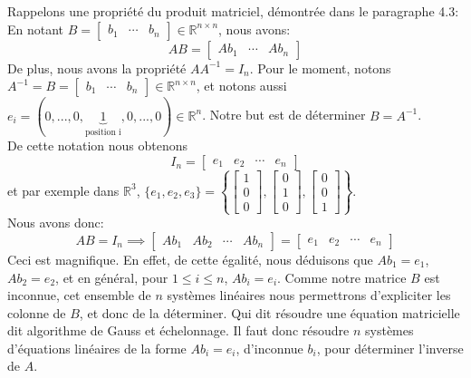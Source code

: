 \documentclass{article}
\newcommand{\R}{\mathbb{R}}
\newcommand{\cross}{\times}
\begin{document}
\noindent Rappelons une propriété du produit matriciel, démontrée dans le paragraphe 4.3: \\
En notant $B = \begin{bmatrix} b_1 & \cdots & b_n \end{bmatrix} \in \R^{n \cross n}$, nous avons:
$$AB = \begin{bmatrix} Ab_1 & \cdots & Ab_n \end{bmatrix}$$
De plus, nous avons la propriété $AA^{-1} = I_n$. Pour le moment, notons $A^{-1} = B = \begin{bmatrix} b_1 & \cdots & b_n \end{bmatrix} \in \R^{n \cross n}$, et notons aussi $e_i = (0, ..., 0, \underbrace{1}_{\text{position i}}, 0, ..., 0) \in \R^n$. Notre but est de déterminer $B = A^{-1}$. \\
De cette notation nous obtenons
$$I_n = \begin{bmatrix} e_1 & e_2 & \cdots & e_n \end{bmatrix}$$ 
et par exemple dans $\R^3$, $\{ e_1, e_2, e_3 \} = \left\{ \begin{bmatrix} 1 \\ 0 \\ 0 \end{bmatrix}, \begin{bmatrix} 0 \\ 1 \\ 0 \end{bmatrix}, \begin{bmatrix} 0 \\ 0 \\ 1 \end{bmatrix} \right\}$. \\

\noindent Nous avons donc:
$$AB = I_n \implies \begin{bmatrix} Ab_1 & Ab_2 & \cdots & Ab_n \end{bmatrix} = \begin{bmatrix} e_1 & e_2 & \cdots & e_n \end{bmatrix}$$
Ceci est magnifique. En effet, de cette égalité, nous déduisons que $Ab_1 = e_1$, $Ab_2 = e_2$, et en général, pour $1 \leq i \leq n$, $Ab_i = e_i$. Comme notre matrice $B$ est inconnue, cet ensemble de $n$ systèmes linéaires nous permettrons d'expliciter les colonne de $B$, et donc de la déterminer. Qui dit résoudre une équation matricielle dit algorithme de Gauss et échelonnage. Il faut donc résoudre $n$ systèmes d'équations linéaires de la forme $Ab_i = e_i$, d'inconnue $b_i$, pour déterminer l'inverse de $A$.\\
\end{document}

